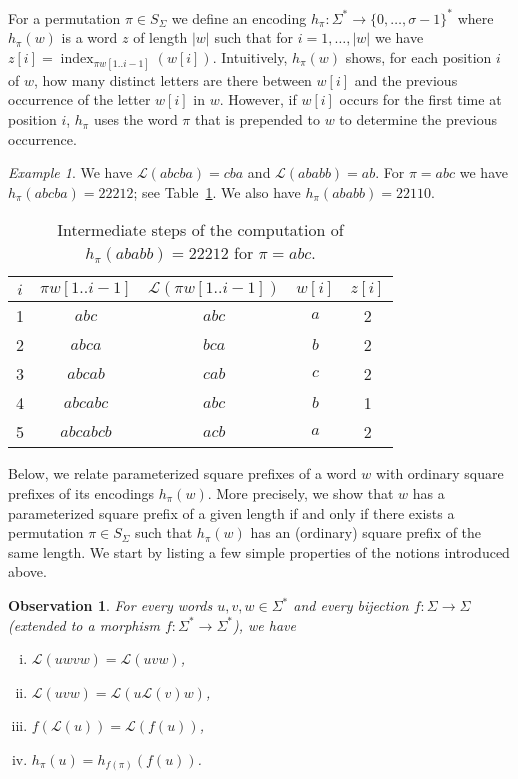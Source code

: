 \documentclass{article}
\theoremstyle{plain}
\newtheorem{observation}[theorem]{Observation}
\theoremstyle{definition}
\theoremstyle{remark}
\newtheorem{example}[theorem]{Example}
\renewcommand{\L}{\mathcal{L}}
\DeclareMathOperator{\ind}{index}
\begin{document}
  For a permutation $\pi \in S_{\Sigma}$ we define an encoding
  $h_{\pi} : \Sigma^* \rightarrow \{0,\ldots,\sigma-1\}^*$ where $h_\pi(w)$ is a word $z$ of length $|w|$
  such that for $i=1,\ldots,|w|$ we have $z[i]=\ind_{\pi w[1..i-1]}(w[i])$.
  Intuitively, $h_\pi(w)$ shows, for each position $i$ of $w$, how many distinct letters are there between
  $w[i]$ and the previous occurrence of the letter $w[i]$ in $w$.
  However, if $w[i]$ occurs for the first time at position $i$, $h_\pi$ uses the word $\pi$
  that is prepended to $w$ to determine the previous occurrence.
  
\begin{example}
We have $\L(abcba)=cba$ and $\L(ababb)=ab$.
For $\pi = abc$ we have
$h_\pi(abcba)=22212$; see Table~\ref{tab:1}. We also have $h_\pi(ababb)=22110$.

\begin{table}[h]
  \begin{center}
    \caption{Intermediate steps of the computation of $h_{\pi}(ababb)=22212$ for $\pi=abc$.}\label{tab:1}
    \footnotesize  
  \begin{tabular}{c|c|c|c|c}
    $i$ & $\pi w[1..i-1]$ & $\L(\pi w[1..i-1])$ & $w[i]$ & $z[i]$\\\hline
      1 & $abc$ & $abc$ & $a$ & 2 \\
      2 & $abca$ & $bca$ & $b$ & 2 \\
      3 & $abcab$ & $cab$ & $c$ & 2 \\
      4 & $abcabc$ & $abc$ & $b$ & 1 \\
      5 & $abcabcb$ & $acb$ & $a$ & 2 
  \end{tabular}
\end{center}
\end{table}
\end{example}

Below, we relate parameterized square prefixes of a word $w$ with ordinary square prefixes of its encodings $h_\pi(w)$.
More precisely, we show that $w$
has a parameterized square prefix of a given length if and only if there exists a permutation $\pi\in S_\Sigma$ such that $h_\pi(w)$ has an (ordinary) square prefix of the same length. We start by listing a few simple properties of the notions introduced above.


\begin{observation}\label{obs:ord}
For every words $u,v,w\in \Sigma^*$ and every bijection $f:\Sigma\to \Sigma$ (extended to a morphism $f:\Sigma^*\to \Sigma^*$), we
have
\begin{enumerate}[(i)]
  \item $\L(uwvw)=\L(uvw)$,
  \item $\L(uvw)=\L(u\L(v)w)$,
  \item $f(\L(u))=\L(f(u))$,
  \item $h_{\pi}(u)=h_{f(\pi)}(f(u))$.
\end{enumerate}
\end{observation}
\end{document}
